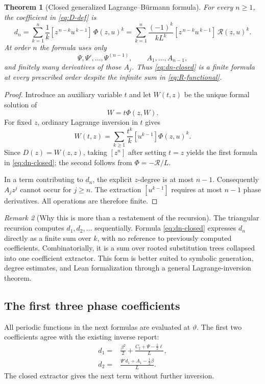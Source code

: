 \documentclass[11pt,oneside]{article}
\numberwithin{equation}{section}
\newtheorem{theorem}{Theorem}[section]
\theoremstyle{definition}
\theoremstyle{remark}
\newtheorem{remark}[theorem]{Remark}
\newcommand{\phase}{\vartheta}
\begin{document}
\begin{theorem}[Closed generalized Lagrange--Bürmann formula]
\label{thm:closed-dn}
For every $n\ge1$, the coefficient in \eqref{eq:D-def} is
\begin{equation}
\boxed{
 d_n=
 \sum_{k=1}^{n}\frac1k
 [z^{\,n-k}u^{\,k-1}]\,\Phi(z,u)^k
 =\sum_{k=1}^{n}\frac{(-1)^k}{kL^k}
 [z^{\,n-k}u^{\,k-1}]\,\mathcal R(z,u)^k.}
 \label{eq:dn-closed}
\end{equation}
At order $n$ the formula uses only
\[
 \Psi,\Psi',\ldots,\Psi^{(n-1)},
 \qquad
 A_1,\ldots,A_{n-1},
\]
and finitely many derivatives of those $A_j$.  Thus \eqref{eq:dn-closed} is a
finite formula at every prescribed order despite the infinite sum in
\eqref{eq:R-functional}.
\end{theorem}

\begin{proof}
Introduce an auxiliary variable $t$ and let $W(t,z)$ be the unique formal
solution of
\[
 W=t\Phi(z,W).
\]
For fixed $z$, ordinary Lagrange inversion in $t$ gives
\[
 W(t,z)=\sum_{k\ge1}\frac{t^k}{k}
 [u^{k-1}]\Phi(z,u)^k.
\]
Since $D(z)=W(z,z)$, taking $[z^n]$ after setting $t=z$ yields the first
formula in \eqref{eq:dn-closed}; the second follows from
$\Phi=-\mathcal R/L$.

In a term contributing to $d_n$, the explicit $z$-degree is at most $n-1$.
Consequently $A_jz^j$ cannot occur for $j\ge n$.  The extraction
$[u^{k-1}]$ requires at most $n-1$ phase derivatives.  All operations are
therefore finite.
\end{proof}

\begin{remark}[Why this is more than a restatement of the recursion]
The triangular recursion computes $d_1,d_2,\ldots$ sequentially.  Formula
\eqref{eq:dn-closed} expresses $d_n$ directly as a finite sum over $k$, with no
reference to previously computed coefficients.  Combinatorially, it is a sum
over rooted substitution trees collapsed into one coefficient extractor.
This form is better suited to symbolic generation, degree estimates, and Lean
formalization through a general Lagrange-inversion theorem.
\end{remark}

\subsection{The first three phase coefficients}

All periodic functions in the next formulas are evaluated at $\phase$.  The
first two coefficients agree with the existing inverse report:
\begin{align}
 d_1={}&\frac{\beta^2}{2}
 +\frac{C_{\sharp}+\Psi-\frac12\ell}{L},
 \label{eq:d1}\\
 d_2={}&\frac{\Psi'd_1+A_1-\frac12\beta}{L}.
 \label{eq:d2}
\end{align}
The closed extractor gives the next term without further inversion.
\end{document}
